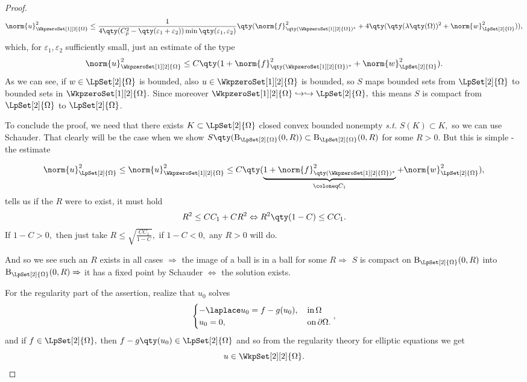 \begin{example}
\begin{proof}
\[
	\norm{u}_{\WkpzeroSet[1][2]{\Omega}}^{2} \leq \frac{1}{4\qty(C_p^{2} - \qty(\varepsilon_1 + \varepsilon_2))\min\qty(\varepsilon_1, \varepsilon_2)}\qty(\norm{f}_{\qty(\WkpzeroSet[1][2]{\Omega})^{*}}^{2}+ 4\qty(\qty(\lambda\qty(\Omega))^{2}+\norm{w}_{\LpSet[2]{\Omega}}^{2})),
\]
which, for $\varepsilon_1, \varepsilon_2$ sufficiently small, just an estimate of the type
\[
	\norm{u}_{\WkpzeroSet[1][2]{\Omega}}^{2} \leq C\qty(1+\norm{f}_{\qty(\WkpzeroSet[1][2]{\Omega})^{*}}^{2} + \norm{w}_{\LpSet[2]{\Omega}}^{2}).
\]
As we can see, if $w \in \LpSet[2]{\Omega}$ is bounded, also $u \in \WkpzeroSet[1][2]{\Omega}$ is bounded, so $S$ maps bounded sets from $\LpSet[2]{\Omega}$ to bounded sets in $\WkpzeroSet[1][2]{\Omega}.$ Since moreover $\WkpzeroSet[1][2]{\Omega} \hookrightarrow \hookrightarrow \LpSet[2]{\Omega}, $ this means $S$ is compact from $\LpSet[2]{\Omega}$ to $\LpSet[2]{\Omega}$.

To conclude the proof, we need that there exists $K \subset \LpSet[2]{\Omega}$ closed convex bounded nonempty \textit{s.t.} $S(K) \subset K,$ so we can use Schauder. That clearly will be the case when we show $S\qty(\text{B}_{\LpSet[2]{\Omega}}(0,R)) \subset \text{B}_{\LpSet[2]{\Omega}}(0,R)$ for some $R>0.$ But this is simple - the estimate

\[
	\norm{u}_{\LpSet[2]{\Omega}}^{2} \leq \norm{u}_{\WkpzeroSet[1][2]{\Omega}}^{2} \leq C\qty(\underbrace{1+\norm{f}_{\qty(\WkpzeroSet[1][2]{\Omega})^{*}}^{2}}_{\coloneq C_1} + \norm{w}_{\LpSet[2]{\Omega}}^{2}),
\]
tells us if the $R$ were to exist, it must hold
\[
	R^{2} \leq C C_1 + C R^{2} \Leftrightarrow R^{2}\qty(1-C)\leq C C_1.
\]
If $1-C >0,$ then just take $R \leq \sqrt{\frac{C C_1}{1-C}},$ if $1-C <0,$ any $R>0$ will do.

And so we see such an $R$ exists in all cases  $\Rightarrow$ the image of a ball is in a ball for some $R \Rightarrow$ $S$ is compact on $\text{B}_{\LpSet[2]{\Omega}}(0,R)$ into $\text{B}_{\LpSet[2]{\Omega}}(0,R) \Rightarrow $ it has a fixed point by Schauder $\Leftrightarrow$ the solution exists.

For the regularity part of the assertion, realize that $u_0$ solves 
\[
	\begin{cases}
		-\laplace u_0 = f-g(u_0), & \, \text{in} \, \Omega \\
		u_0 = 0, & \, \text{on} \, \partial \Omega. 
	\end{cases},
\]
and if $f \in \LpSet[2]{\Omega},$ then $f-g\qty(u_0) \in \LpSet[2]{\Omega}$ and so from the regularity theory for elliptic equations we get
\[
	u \in \WkpSet[2][2]{\Omega}.
\]
\end{proof}


\end{example}
